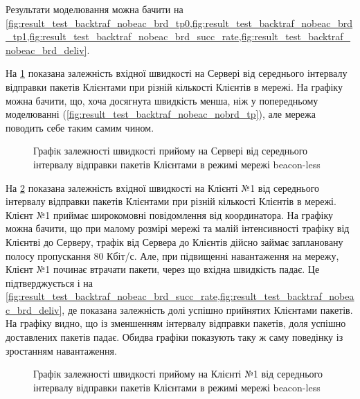 \documentclass[a4paper,ukrainian,utf8,nocolumnsxix,floatsection,equationsection]{eskdtext}
\newcommand{\longcaption}[1]{\captionsetup{style=figureLongCaption}\caption{#1}}
\newcommand{\blm}[0]{beacon-less\xspace}
\begin{document}
Результати моделювання можна бачити на \cref{fig:result_test_backtraf_nobeac_brd_tp0,fig:result_test_backtraf_nobeac_brd_tp1,fig:result_test_backtraf_nobeac_brd_succ_rate,fig:result_test_backtraf_nobeac_brd_deliv}.



На \cref{fig:result_test_backtraf_nobeac_brd_tp0} показана залежність вхідної швидкості на Сервері від середнього інтервалу відправки пакетів Клієнтами при різній кількості Клієнтів в мережі. На графіку можна бачити, що, хоча досягнута швидкість менша, ніж у попередньому моделюванні (\cref{fig:result_test_backtraf_nobeac_nobrd_tp}), але мережа поводить себе таким самим чином.
\begin{figure}[htbp]
	\centering
	\longcaption{\label{fig:result_test_backtraf_nobeac_brd_tp0}Графiк залежності швидкості прийому на Сервері від середнього інтервалу відправки пакетів Клієнтами в режимі мережі \blm}
\end{figure}


На \cref{fig:result_test_backtraf_nobeac_brd_tp1} показана залежність вхідної швидкості на Клієнті №1 від середнього інтервалу відправки пакетів Клієнтами при різній кількості Клієнтів в мережі. Клієнт №1 приймає широкомовні повідомлення від координатора. На графіку можна бачити, що при малому розмірі мережі та малій інтенсивності трафіку від Клієнтві до Серверу, трафік від Сервера до Клієнтів дійсно займає заплановану полосу пропускання 80 Кбіт/с. Але, при підвищенні навантаження на мережу, Клієнт №1 починає втрачати пакети, через що вхідна швидкість падає. Це підтверджується і на \cref{fig:result_test_backtraf_nobeac_brd_succ_rate,fig:result_test_backtraf_nobeac_brd_deliv}, де показана залежність долі успішно прийнятих Клієнтами пакетів. На графіку видно, що із зменшенням інтервалу відправки пакетів, доля успішно доставлених пакетів падає. Обидва графіки показують таку ж саму поведінку із зростанням навантаження. 

\begin{figure}[htbp]
	\centering
	\longcaption{\label{fig:result_test_backtraf_nobeac_brd_tp1}Графiк залежності швидкості прийому на Клієнті №1 від середнього інтервалу відправки пакетів Клієнтами в режимі мережі \blm}
\end{figure}
\end{document}
